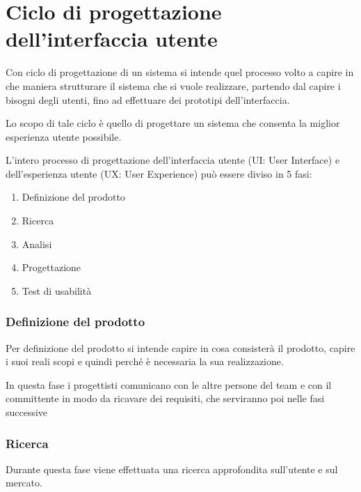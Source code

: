 \hypertarget{ciclo-di-progettazione-dellinterfaccia-utente}{%
\section{Ciclo di progettazione dell'interfaccia utente}\label{ciclo-di-progettazione-dellinterfaccia-utente}}

Con ciclo di progettazione di un sistema si intende quel processo volto a capire in che maniera strutturare il sistema che si vuole realizzare, partendo dal capire i bisogni degli utenti, fino ad effettuare dei prototipi dell'interfaccia.

Lo scopo di tale ciclo è quello di progettare un sistema che consenta la miglior esperienza utente possibile.

L'intero processo di progettazione dell'interfaccia utente (UI: User Interface) e dell'esperienza utente (UX: User Experience) può essere diviso in 5 fasi: \cite{ui-ux-design-process} \cite{ux-design-process-steps}

\begin{enumerate}
    \item Definizione del prodotto
    \item Ricerca
    \item Analisi
    \item Progettazione
    \item Test di usabilità
\end{enumerate}

\hypertarget{definizione-del-prodotto}{%
\subsubsection{Definizione del prodotto}\label{definizione-del-prodotto}}

Per definizione del prodotto si intende capire in cosa consisterà il prodotto, capire i suoi reali scopi e quindi perché è necessaria la sua realizzazione.

In questa fase i progettisti comunicano con le altre persone del team e con il committente in modo da ricavare dei requisiti, che serviranno poi nelle fasi successive

\hypertarget{ricerca}{%
\subsubsection{Ricerca}\label{ricerca}}

Durante questa fase viene effettuata una ricerca approfondita sull'utente e sul mercato.

